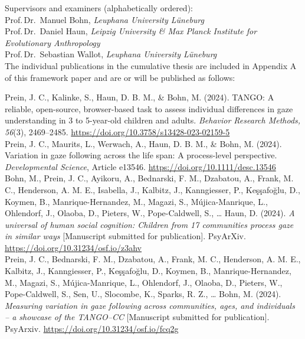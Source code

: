 \documentclass[
]{scrbook}
\begin{document}
\begin{titlepage}
\begin{flushleft}
\begin{normalsize}
            Supervisors and examiners (alphabetically ordered): \\[5mm]
            \tabto*{5mm} Prof.\,Dr.\, Manuel Bohn, \textit{Leuphana University Lüneburg}\\
            \tabto*{5mm} Prof.\,Dr.\, Daniel Haun, \textit{Leipzig University \& Max Planck Institute for Evolutionary Anthropology}\\
                \tabto*{5mm} Prof.\,Dr.\, Sebastian Wallot, \textit{Leuphana University Lüneburg}\\[10mm]
                
                The individual publications in the cumulative thesis are included in Appendix A of this framework paper and are or will be published as follows: \\[5mm]
                
                \begin{hangparas}{5mm}{1}

Prein, J. C., Kalinke, S., Haun, D. B. M.\*, \& Bohn, M.\* (2024). TANGO: A reliable, open-source, browser-based task to assess individual differences in gaze understanding in 3 to 5-year-old children and adults. \textit{Behavior Research Methods, 56}(3), 2469–2485. \mbox{\url{https://doi.org/10.3758/s13428-023-02159-5}} \\[5mm]

Prein, J. C., Maurits, L., Werwach, A., Haun, D. B. M.,\* \& Bohn, M.\* (2024). Variation in gaze following across the life span: A process-level perspective. \textit{Developmental Science}, Article e13546. \mbox{\url{https://doi.org/10.1111/desc.13546}} \\[5mm]

Bohn, M.\*, Prein, J. C.\*, Ayikoru, A., Bednarski, F. M., Dzabatou, A., Frank, M. C., Henderson, A. M. E., Isabella, J., Kalbitz, J., Kanngiesser, P., Keşşafoğlu, D., Koymen, B., Manrique-Hernandez, M., Magazi, S., Mújica-Manrique, L., Ohlendorf, J., Olaoba, D., Pieters, W., Pope-Caldwell, S., … Haun, D. (2024). \textit{A universal of human social cognition: Children from 17 communities process gaze in similar ways} [Manuscript submitted for publication]. PsyArXiv. \mbox{\url{https://doi.org/10.31234/osf.io/z3ahv}} \\[5mm]

Prein, J. C., Bednarski, F. M., Dzabatou, A., Frank, M. C., Henderson, A. M. E., Kalbitz, J., Kanngiesser, P., Keşşafoğlu, D., Koymen, B., Manrique-Hernandez, M., Magazi, S., Mújica-Manrique, L., Ohlendorf, J., Olaoba, D., Pieters, W., Pope-Caldwell, S., Sen, U., Slocombe, K., Sparks, R. Z., … Bohn, M. (2024). \textit{Measuring variation in gaze following across communities, ages, and individuals – a showcase of the TANGO–CC} [Manuscript submitted for publication]. PsyArxiv. \mbox{\url{https://doi.org/10.31234/osf.io/fcq2g}}

                \end{hangparas}
        \end{normalsize}
    \end{flushleft}
    
\end{titlepage}
\end{document}

